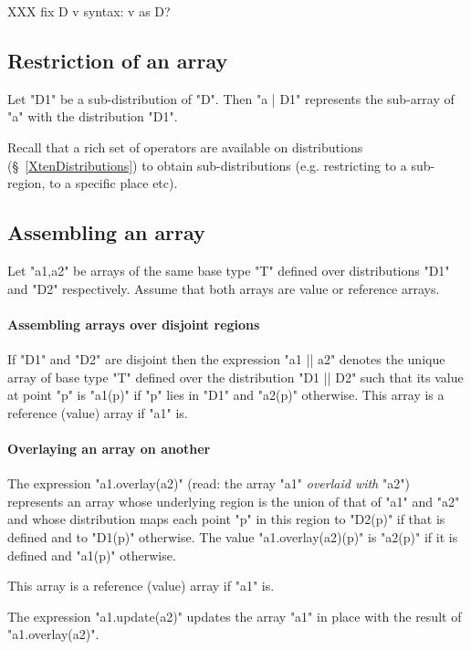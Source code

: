 XXX fix D v syntax: v as D?

\subsection{Restriction of an array}

Let \xcd"D1" be a sub-distribution of \xcd"D". Then \xcd"a | D1"
represents the sub-array of \xcd"a" with the distribution \xcd"D1".

Recall that a rich set of operators are available on distributions
(\S~\ref{XtenDistributions}) to obtain sub-distributions
(e.g. restricting to a sub-region, to a specific place etc).

\subsection{Assembling an array}
Let \xcd"a1,a2" be arrays of the same base type \xcd"T" defined over
distributions \xcd"D1" and \xcd"D2" respectively. Assume that both
arrays are value or reference arrays. 
\paragraph{Assembling arrays over disjoint regions}

If \xcd"D1" and \xcd"D2" are disjoint then the expression \xcd"a1 || a2" denotes the unique array of base type \xcd"T" defined over the
distribution \xcd"D1 || D2" such that its value at point \xcd"p" is
\xcd"a1(p)" if \xcd"p" lies in \xcd"D1" and \xcd"a2(p)"
otherwise. This array is a reference (value) array if \xcd"a1" is.

\paragraph{Overlaying an array on another}
The expression
\xcd"a1.overlay(a2)" (read: the array \xcd"a1" {\em overlaid with} \xcd"a2")
represents an array whose underlying region is the union of that of
\xcd"a1" and \xcd"a2" and whose distribution maps each point \xcd"p"
in this region to \xcd"D2(p)" if that is defined and to \xcd"D1(p)"
otherwise. The value \xcd"a1.overlay(a2)(p)" is \xcd"a2(p)" if it is defined and \xcd"a1(p)" otherwise.

This array is a reference (value) array if \xcd"a1" is.

The expression \xcd"a1.update(a2)" updates the array \xcd"a1" in place
with the result of \xcd"a1.overlay(a2)".

